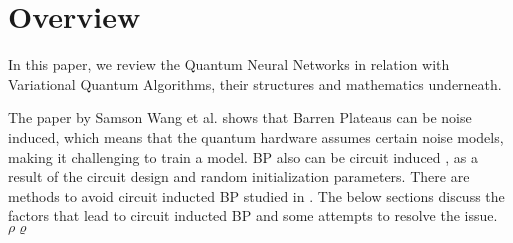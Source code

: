 \section{Overview}
In this paper, we review the Quantum Neural Networks in relation with Variational Quantum Algorithms, their structures and mathematics underneath.

The paper \cite{wangNoiseinducedBarrenPlateaus2021} by Samson Wang et al. shows that Barren Plateaus can be noise induced, which means that the quantum hardware assumes certain noise models, making it challenging to train a model. 
BP also can be circuit induced \cite{mccleanBarrenPlateausQuantum2018}, as a result of the circuit design and random initialization parameters.
There are methods to avoid circuit inducted BP studied in \cite{pesahAbsenceBarrenPlateaus2021, cerezoCostFunctionDependent2021,skolikLayerwiseLearningQuantum2021}.
The below sections discuss the factors that lead to circuit inducted BP and some attempts to resolve the issue.
$\rho \varrho$
